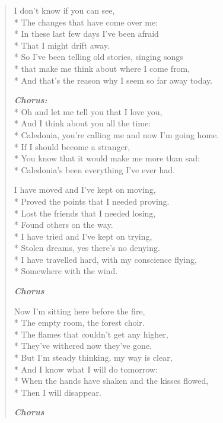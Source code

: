 \documentclass[9pt,twoside]{extarticle}
\newenvironment{xverse}{
	\begin{verse}
	\fontsize{8.5}{10.5}\selectfont
	}
	{
	\end{verse}
	\penalty 0
}
\newcommand{\chorusdef}{\textbf{\emph{Chorus:}}\\*}
\newcommand{\chorusmark}[1][1]{%
\vspace{-0.5\stanzaskip}%
\textbf{\emph{Chorus \ifthenelse{\equal{#1}{1}}{}{$\times$ #1}}}%
\vspace{-0.5\stanzaskip}%
}
\begin{document}
\begin{xverse}
I don’t know if you can see, \\*
The changes that have come over me: \\*
In these last few days I’ve been afraid \\*
That I might drift away. \\*
So I’ve been telling old stories, singing songs \\*
that make me think about where I come from, \\*
And that’s the reason why I seem so far away today.

\chorusdef
Oh and let me tell you that I love you, \\*
And I think about you all the time: \\*
Caledonia, you’re calling me and now I’m going home. \\*
If I should become a stranger, \\*
You know that it would make me more than sad: \\*
Caledonia’s been everything I’ve ever had.

I have moved and I’ve kept on moving, \\*
Proved the points that I needed proving. \\*
Lost the friends that I needed losing, \\*
Found others on the way. \\*
I have tried and I’ve kept on trying, \\*
Stolen dreams, yes there’s no denying. \\*
I have travelled hard, with my conscience flying, \\*
Somewhere with the wind.

\chorusmark

Now I’m sitting here before the fire, \\*
The empty room, the forest choir. \\*
The flames that couldn’t get any higher, \\*
They’ve withered now they’ve gone. \\*
But I’m steady thinking, my way is clear, \\*
And I know what I will do tomorrow: \\*
When the hands have shaken and the kisses flowed, \\*
Then I will disappear.

\chorusmark
\end{xverse}
\end{document}
